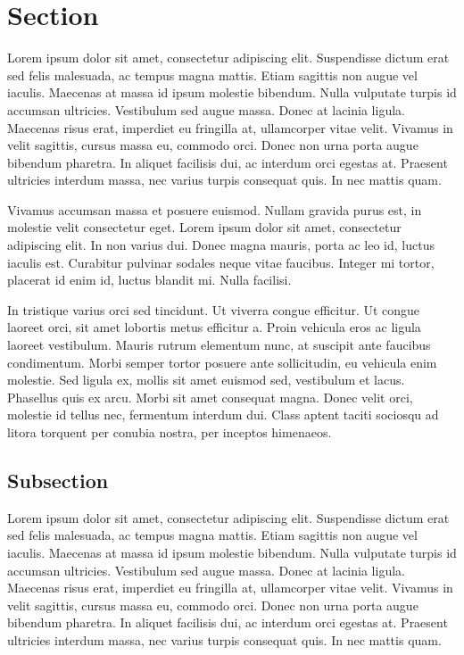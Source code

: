 \documentclass[a4paper,12pt]{article}
\begin{document}
\titlepagex



\section{Section}

Lorem ipsum dolor sit amet, consectetur adipiscing elit. Suspendisse dictum erat sed felis malesuada, ac tempus magna mattis. Etiam sagittis non augue vel iaculis. Maecenas at massa id ipsum molestie bibendum. Nulla vulputate turpis id accumsan ultricies. Vestibulum sed augue massa. Donec at lacinia ligula. Maecenas risus erat, imperdiet eu fringilla at, ullamcorper vitae velit. Vivamus in velit sagittis, cursus massa eu, commodo orci. Donec non urna porta augue bibendum pharetra. In aliquet facilisis dui, ac interdum orci egestas at. Praesent ultricies interdum massa, nec varius turpis consequat quis. In nec mattis quam.

Vivamus accumsan massa et posuere euismod. Nullam gravida purus est, in molestie velit consectetur eget. Lorem ipsum dolor sit amet, consectetur adipiscing elit. In non varius dui. Donec magna mauris, porta ac leo id, luctus iaculis est. Curabitur pulvinar sodales neque vitae faucibus. Integer mi tortor, placerat id enim id, luctus blandit mi. Nulla facilisi.

In tristique varius orci sed tincidunt. Ut viverra congue efficitur. Ut congue laoreet orci, sit amet lobortis metus efficitur a. Proin vehicula eros ac ligula laoreet vestibulum. Mauris rutrum elementum nunc, at suscipit ante faucibus condimentum. Morbi semper tortor posuere ante sollicitudin, eu vehicula enim molestie. Sed ligula ex, mollis sit amet euismod sed, vestibulum et lacus. Phasellus quis ex arcu. Morbi sit amet consequat magna. Donec velit orci, molestie id tellus nec, fermentum interdum dui. Class aptent taciti sociosqu ad litora torquent per conubia nostra, per inceptos himenaeos.

\subsection{Subsection} 

Lorem ipsum dolor sit amet, consectetur adipiscing elit. Suspendisse dictum erat sed felis malesuada, ac tempus magna mattis. Etiam sagittis non augue vel iaculis. Maecenas at massa id ipsum molestie bibendum. Nulla vulputate turpis id accumsan ultricies. Vestibulum sed augue massa. Donec at lacinia ligula. Maecenas risus erat, imperdiet eu fringilla at, ullamcorper vitae velit. Vivamus in velit sagittis, cursus massa eu, commodo orci. Donec non urna porta augue bibendum pharetra. In aliquet facilisis dui, ac interdum orci egestas at. Praesent ultricies interdum massa, nec varius turpis consequat quis. In nec mattis quam.
\end{document}
